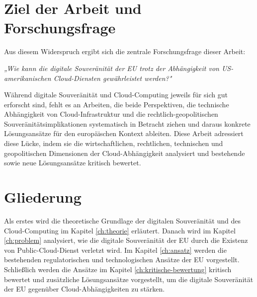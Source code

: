 %
%
\section{Ziel der Arbeit und Forschungsfrage}
\label{sec:intro:goal}
Aus diesem Widerspruch ergibt sich die zentrale 
Forschungsfrage dieser Arbeit:

\begin{center}
\textit{„Wie kann die digitale Souveränität der \ac{EU} 
trotz der Abhängigkeit von 
US-amerikanischen Cloud-Diensten gewährleistet werden?"}
\end{center}

\noindent
Während digitale Souveränität und Cloud-Computing 
jeweils für sich gut erforscht sind, fehlt es 
an Arbeiten, die beide Perspektiven, die 
technische Abhängigkeit von Cloud-Infrastruktur 
und die rechtlich-geopolitischen 
Souveränitätsimplikationen systematisch 
in Betracht ziehen und daraus konkrete Lösungsansätze 
für den europäischen Kontext ableiten.
Diese Arbeit 
adressiert diese Lücke, indem sie die wirtschaftlichen, rechtlichen, 
technischen und geopolitischen Dimensionen der 
Cloud-Abhängigkeit analysiert und bestehende sowie 
neue Lösungsansätze kritisch bewertet.

%
%
\section{Gliederung}
\label{sec:intro:structure}
 Als erstes wird die theoretische Grundlage der digitalen Souveränität und des Cloud-Computing im Kapitel \ref{ch:theorie} erläutert. Danach wird im Kapitel \ref{ch:problem} analysiert, wie die digitale Souveränität der \ac{EU} durch die Existenz von Public-Cloud-Dienst verletzt wird. Im Kapitel \ref{ch:ansatz} werden die bestehenden regulatorischen und technologischen Ansätze der \ac{EU} vorgestellt. Schließlich werden die Ansätze im Kapitel \ref{ch:kritische-bewertung} kritisch bewertet und zusätzliche Lösungsansätze vorgestellt, um die digitale Souveränität der \ac{EU} gegenüber Cloud-Abhängigkeiten zu stärken.   